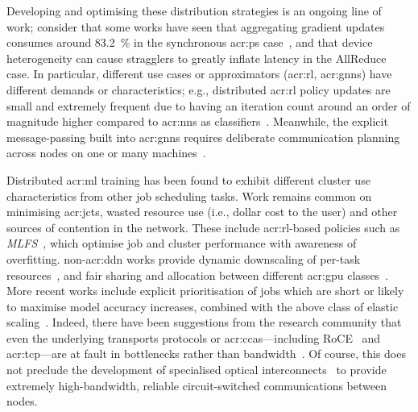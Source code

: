 Developing and optimising these distribution strategies is an ongoing line of work; consider that some works have seen that aggregating gradient updates consumes around \qty{83.2}{\percent} in the synchronous \gls{acr:ps} case~\parencite{DBLP:conf/isca/LiLYCSH19}, and that device heterogeneity can cause stragglers to greatly inflate latency in the AllReduce case.
In particular, different use cases or approximators (\gls{acr:rl}, \glspl{acr:gnn}) have different demands or characteristics; e.g., distributed \gls{acr:rl} policy updates are small and extremely frequent due to having an iteration count around an order of magnitude higher compared to \glspl{acr:nn} as classifiers~\parencite{DBLP:conf/isca/LiLYCSH19}.
Meanwhile, the explicit message-passing built into \glspl{acr:gnn} requires deliberate communication planning across nodes on one or many machines~\parencite{DBLP:conf/eurosys/Cai0WMCY21,DBLP:conf/eurosys/WangY0YCYYZ21}.

Distributed \gls{acr:ml} training has been found to exhibit different cluster use characteristics from other job scheduling tasks.
Work remains common on minimising \glspl{acr:jct}, wasted resource use (i.e., dollar cost to the user) and other sources of contention in the network.
These include \gls{acr:rl}-based policies such as \emph{MLFS}~\parencite{DBLP:conf/conext/0002LS20}, which optimise job and cluster performance with awareness of overfitting.
non-\gls{acr:ddn} works provide dynamic downscaling of per-task resources~\parencite{DBLP:conf/eurosys/MisraLDBKGST21}, and fair sharing and allocation between different \gls{acr:gpu} classes~\parencite{DBLP:conf/eurosys/ChaudharyRSKV20}.
More recent works include explicit prioritisation of jobs which are short or likely to maximise model accuracy increases, combined with the above class of elastic scaling~\parencite{DBLP:conf/nsdi/HwangKKSP21}.
Indeed, there have been suggestions from the research community that even the underlying transports protocols or \glspl{acr:cca}---including RoCE~\parencite{rocev2} and \gls{acr:tcp}---are at fault in bottlenecks rather than bandwidth~\parencite{DBLP:conf/sigcomm/ZhangCLWAJ20}.
Of course, this does not preclude the development of specialised optical interconnects~\parencite{DBLP:conf/sigcomm/ShirkoohiGAZGBV21} to provide extremely high-bandwidth, reliable circuit-switched communications between nodes.

